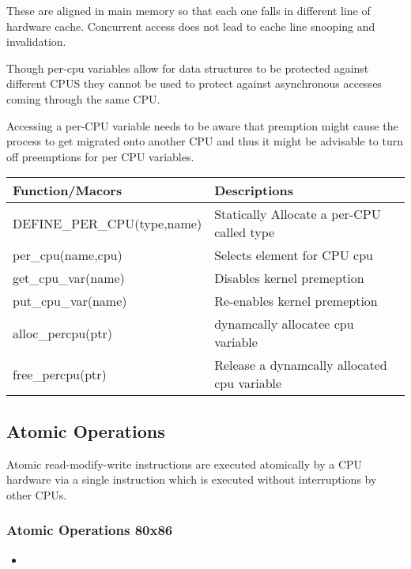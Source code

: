 \documentclass{article}
\begin{document}
These are aligned in main memory so that each one falls in different
line of hardware cache. Concurrent access does not lead to cache line
snooping and invalidation.

Though per-cpu variables allow for data structures to be protected
against different CPUS they cannot be used to protect against
asynchronous accesses coming through the same CPU.

Accessing a per-CPU variable needs to be aware that premption might
cause the process to get migrated onto another CPU and thus it might
be advisable to turn off preemptions for per CPU variables.


\begin{center}
  \begin{tabular}{ l | l }
    
    \hline
    Function/Macors & Descriptions \\ \hline
    DEFINE\_PER\_CPU(type,name) & Statically Allocate a per-CPU called type \\ 
    per\_cpu(name,cpu) & Selects element for CPU cpu \\ 
    get\_cpu\_var(name) &  Disables kernel premeption \\
    put\_cpu\_var(name) &  Re-enables kernel premeption \\
    alloc\_percpu(ptr) &  dynamcally allocatee cpu variable \\
    free\_percpu(ptr) &  Release a dynamcally allocated cpu variable \\
    \hline
  \end{tabular}
\end{center}

\subsection{Atomic Operations}

Atomic read-modify-write instructions are executed atomically by a CPU
hardware via a single instruction which is executed without
interruptions by other CPUs.

\subsubsection{Atomic Operations 80x86}

\begin{itemize}
  \item 
\end{itemize}
\end{document}
